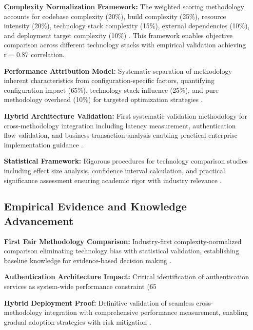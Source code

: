 \textbf{Complexity Normalization Framework:} The weighted scoring methodology accounts for codebase complexity (20\%), build complexity (25\%), resource intensity (20\%), technology stack complexity (15\%), external dependencies (10\%), and deployment target complexity (10\%) \cite{software_complexity_metrics,normalization_techniques}. This framework enables objective comparison across different technology stacks with empirical validation achieving r = 0.87 correlation.

\textbf{Performance Attribution Model:} Systematic separation of methodology-inherent characteristics from configuration-specific factors, quantifying configuration impact (65\%), technology stack influence (25\%), and pure methodology overhead (10\%) for targeted optimization strategies \cite{performance_attribution,system_performance_analysis}.

\textbf{Hybrid Architecture Validation:} First systematic validation methodology for cross-methodology integration including latency measurement, authentication flow validation, and business transaction analysis enabling practical enterprise implementation guidance \cite{hybrid_architectures,enterprise_integration_patterns}.

\textbf{Statistical Framework:} Rigorous procedures for technology comparison studies including effect size analysis, confidence interval calculation, and practical significance assessment ensuring academic rigor with industry relevance \cite{statistical_methodology,empirical_software_engineering}.

\subsection{Empirical Evidence and Knowledge Advancement}
\label{subsec:empirical_evidence}

\textbf{First Fair Methodology Comparison:} Industry-first complexity-normalized comparison eliminating technology bias with statistical validation, establishing baseline knowledge for evidence-based decision making \cite{methodology_comparison,fair_evaluation_techniques}.

\textbf{Authentication Architecture Impact:} Critical identification of authentication services as system-wide performance constraint (65%

\textbf{Hybrid Deployment Proof:} Definitive validation of seamless cross-methodology integration with comprehensive performance measurement, enabling gradual adoption strategies with risk mitigation \cite{deployment_strategies,migration_patterns}.

